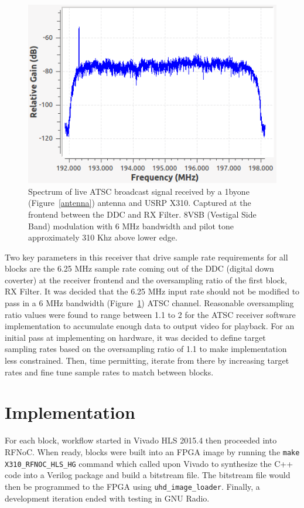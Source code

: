 \documentclass{article}
\begin{document}
\begin{figure}[h]
  \begin{center}
    \centerline{\includegraphics[width=\columnwidth]{spectrum.png}}
    \caption{Spectrum of live ATSC broadcast signal received by a 1byone (Figure~\ref{antenna}) antenna and USRP X310. Captured at the frontend between the DDC and RX Filter. 8VSB (Vestigal Side Band) modulation with 6 MHz bandwidth and pilot tone approximately 310 Khz above lower edge.}
    \label{spectrum}
  \end{center}
\end{figure}

Two key parameters in this receiver that drive sample rate requirements for all blocks are the 6.25 MHz sample rate coming out of the DDC (digital down coverter) at the receiver frontend and the oversampling ratio of the first block, RX Filter. It was decided that the 6.25 MHz input rate should not be modified to pass in a 6 MHz bandwidth (Figure~\ref{spectrum}) ATSC channel. Reasonable oversampling ratio values were found to range between 1.1 to 2 for the ATSC receiver software implementation to accumulate enough data to output video for playback. For an initial pass at implementing on hardware, it was decided to define target sampling rates based on the oversampling ratio of 1.1 to make implementation less constrained. Then, time permitting, iterate from there by increasing target rates and fine tune sample rates to match between blocks.

\section{Implementation} \label{implementation}
For each block, workflow started in Vivado HLS 2015.4 then proceeded into RFNoC. When ready, blocks were built into an FPGA image by running the {\tt make X310\_RFNOC\_HLS\_HG} command which called upon Vivado to synthesize the C++ code into a Verilog package and build a bitstream file. The bitstream file would then be programmed to the FPGA using {\tt uhd\_image\_loader}. Finally, a development iteration ended with testing in GNU Radio.
\end{document}
